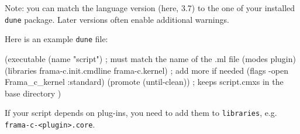 Note: you can match the language version (here, 3.7) to the one of your
installed \texttt{dune} package. Later versions often enable additional
warnings.

Here is an example \texttt{dune} file:
\begin{dunecode}
(executable
  (name "script") ; must match the name of the .ml file
  (modes plugin)
  (libraries frama-c.init.cmdline frama-c.kernel) ; add more if needed
  (flags -open Frama_c_kernel :standard)
  (promote (until-clean)) ; keeps script.cmxs in the base directory
)
\end{dunecode}

If your script depends on \FramaC plug-ins, you need to add them to
\texttt{libraries}, e.g. \texttt{frama-c-<plugin>.core}.

